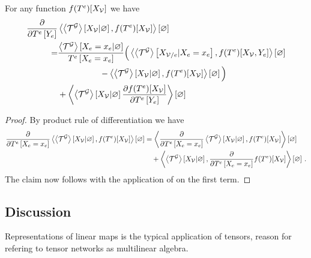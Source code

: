 \begin{lemma}
    \label{lem:difMNExpectation}
    For any function $f(T^{e})[X_{\mathcal{V}}]$ we have
    \begin{align*}
        \frac{\partial }{\partial T^{e}\left[Y_{e}\right]} &
        \left\langle \left\langle \mathcal{T}^{\mathcal{G}}\right\rangle \left[ X_{\mathcal{V}} | \varnothing \right],f(T^{e})[X_{\mathcal{V}}]\right\rangle \left[ \varnothing \right] \\
        = &
        \frac{\left\langle \mathcal{T}^{\mathcal{G}}\right\rangle \left[ X_{e}=x_{e} | \varnothing \right]}{T^{e}\left[X_{e}=x_{e}\right]}
        \Big( \left\langle \left\langle \mathcal{T}^{\mathcal{G}}\right\rangle \left[ X_{\mathcal{V}/e} | X_{e}=x_{e} \right], f(T^{e})[X_{\mathcal{V}},Y_{e}]\right\rangle \left[ \varnothing \right] \\
        & \quad \quad \quad \quad \quad - \left\langle \left\langle \mathcal{T}^{\mathcal{G}}\right\rangle \left[ X_{\mathcal{V}} | \varnothing \right], f(T^{e})[X_{\mathcal{V}}]\right\rangle \left[ \varnothing \right]
        \Big) \\
        & + \left\langle  \left\langle \mathcal{T}^{\mathcal{G}}\right\rangle \left[ X_{\mathcal{V}} | \varnothing \right]
        \frac{\partial f(T^{e})[X_{\mathcal{V}}]}{\partial T^{e}\left[Y_{e}\right]}
        \right\rangle \left[ \varnothing \right]
    \end{align*}
\end{lemma}
\begin{proof}
    By product rule of differentiation we have
    \begin{align*}
        \frac{\partial }{\partial T^{e}\left[X_{e}=x_{e}\right]} \left\langle \left\langle \mathcal{T}^{\mathcal{G}}\right\rangle \left[ X_{\mathcal{V}} | \varnothing \right],f(T^{e})[X_{\mathcal{V}}]\right\rangle \left[ \varnothing \right]
        & =  \left\langle \frac{\partial }{\partial T^{e}\left[X_{e}=x_{e}\right]}\left\langle \mathcal{T}^{\mathcal{G}}\right\rangle \left[ X_{\mathcal{V}} | \varnothing \right],f(T^{e})[X_{\mathcal{V}}]\right\rangle \left[ \varnothing \right] \\
        & \quad +  \left\langle \left\langle \mathcal{T}^{\mathcal{G}}\right\rangle \left[ X_{\mathcal{V}} | \varnothing \right],\frac{\partial }{\partial T^{e}\left[X_{e}=x_{e}\right]}f(T^{e})[X_{\mathcal{V}}]\right\rangle \left[ \varnothing \right]  \, .
    \end{align*}
    The claim now follows with the application of  on the first term.
\end{proof}

\subsection{Discussion}

Representations of linear maps is the typical application of tensors, reason for refering to tensor networks as multilinear algebra.
